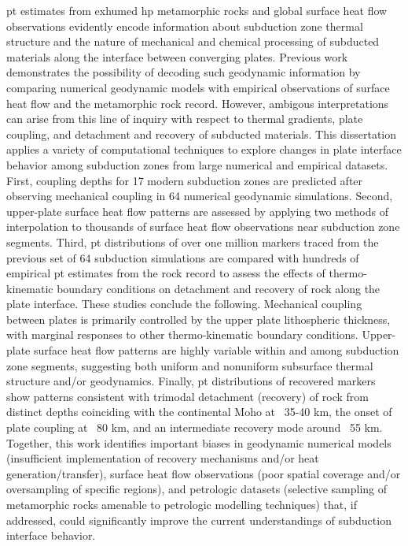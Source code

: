 \Gls{pt} estimates from exhumed \gls{hp} metamorphic rocks and global surface heat flow observations evidently encode information about subduction zone thermal structure and the nature of mechanical and chemical processing of subducted materials along the interface between converging plates. Previous work demonstrates the possibility of decoding such geodynamic information by comparing numerical geodynamic models with empirical observations of surface heat flow and the metamorphic rock record. However, ambigous interpretations can arise from this line of inquiry with respect to thermal gradients, plate coupling, and detachment and recovery of subducted materials. This dissertation applies a variety of computational techniques to explore changes in plate interface behavior among subduction zones from large numerical and empirical datasets. First, coupling depths for 17 modern subduction zones are predicted after observing mechanical coupling in 64 numerical geodynamic simulations. Second, upper-plate surface heat flow patterns are assessed by applying two methods of interpolation to thousands of surface heat flow observations near subduction zone segments. Third, \gls{pt} distributions of over one million markers traced from the previous set of 64 subduction simulations are compared with hundreds of empirical \gls{pt} estimates from the rock record to assess the effects of thermo-kinematic boundary conditions on detachment and recovery of rock along the plate interface. These studies conclude the following. Mechanical coupling between plates is primarily controlled by the upper plate lithospheric thickness, with marginal responses to other thermo-kinematic boundary conditions. Upper-plate surface heat flow patterns are highly variable within and among subduction zone segments, suggesting both uniform and nonuniform subsurface thermal structure and/or geodynamics. Finally, \gls{pt} distributions of recovered markers show patterns consistent with trimodal detachment (recovery) of rock from distinct depths coinciding with the continental Moho at ~35-40 km, the onset of plate coupling at ~80 km, and an intermediate recovery mode around ~55 km. Together, this work identifies important biases in geodynamic numerical models (insufficient implementation of recovery mechanisms and/or heat generation/transfer), surface heat flow observations (poor spatial coverage and/or oversampling of specific regions), and petrologic datasets (selective sampling of metamorphic rocks amenable to petrologic modelling techniques) that, if addressed, could significantly improve the current understandings of subduction interface behavior.